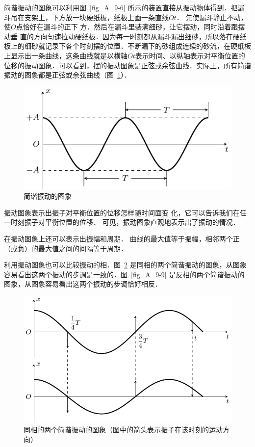 简谐振动的图象可以利用图~\ref{fig_A_9-6} 所示的装置直接从振动物体得到．把漏斗吊在支架上，下方放一块硬纸板，纸板上画一条直线$Ot$．
先使漏斗静止不动，使$O$点恰好在漏斗的正下
方．然后在漏斗里装满细砂，让它摆动，同时沿着跟摆动垂
直的方向匀速拉动硬纸板．因为每一时刻都从漏斗漏出细砂，所以落在硬纸板上的细砂就记录下各个时刻摆的位置．不断漏下的砂组成连续的砂流，在硬纸板上显示出一条曲线，这条曲线就是以横轴$Ot$表示时间、以纵轴表示对平衡位置的位移的振动图象．可以看到，摆的振动图象是正弦或余弦曲线．实际上，所有简谐振动的图象都是正弦或余弦曲线（图~\ref{fig_A_9-7}）．
\begin{figure}[htbp]
    \centering
    \includegraphics{fig/A/9-7.pdf}
    \caption{简谐振动的图象}\label{fig_A_9-7}
\end{figure}

振动图象表示出振子对平衡位置的位移怎样随时间面变
化，它可以告诉我们在任一时刻振子对平衡位置的位移．
可见，振动图象直观地表示出了振动的情况．

在振动图象上还可以表示出振幅和周期．
曲线的最大值等于振幅，相邻两个正（或负）的最大值之间的间隔等于周期．

利用振动图象也可以比较振动的相．图~\ref{fig_A_9-8} 是同相的两个简谐振动的图象，从图象容易看出这两个振动的步调是一致的．图~\ref{fig_A_9-9} 是反相的两个简谐振动的图象，从图象容易看出这两个振动的步调恰好相反．

\begin{figure}[htbp]
    \centering
    \includegraphics{fig/A/9-8.pdf}
    \caption{同相的两个简谐振动的图象（图中的箭头表示振子在该时刻的运动方向）}\label{fig_A_9-8}
\end{figure}

